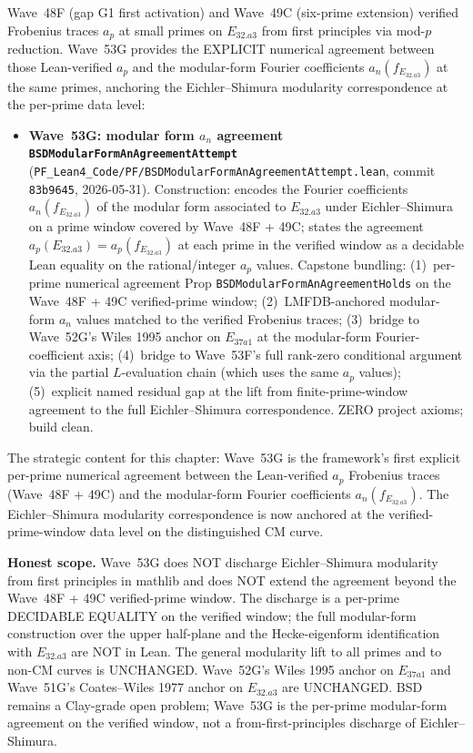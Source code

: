\begin{remark}\label{rem:bsd-wave53g-lean}
Wave~48F (gap G1 first activation) and Wave~49C (six-prime extension) verified Frobenius traces $a_p$ at small primes on $E_{32.a3}$ from first principles via mod-$p$ reduction. Wave~53G provides the EXPLICIT numerical agreement between those Lean-verified $a_p$ and the modular-form Fourier coefficients $a_n(f_{E_{32.a3}})$ at the same primes, anchoring the Eichler--Shimura modularity correspondence at the per-prime data level:
\begin{itemize}
  \item \textbf{Wave~53G: modular form $a_n$ agreement \texttt{BSDModularFormAnAgreementAttempt}} (\texttt{PF\_Lean4\_Code/PF/BSDModularFormAnAgreementAttempt.lean}, commit \texttt{83b9645}, 2026-05-31). Construction: encodes the Fourier coefficients $a_n(f_{E_{32.a3}})$ of the modular form associated to $E_{32.a3}$ under Eichler--Shimura on a prime window covered by Wave~48F + 49C; states the agreement $a_p(E_{32.a3}) = a_p(f_{E_{32.a3}})$ at each prime in the verified window as a decidable Lean equality on the rational/integer $a_p$ values. Capstone bundling: (1)~per-prime numerical agreement Prop \texttt{BSDModularFormAnAgreementHolds} on the Wave~48F + 49C verified-prime window; (2)~LMFDB-anchored modular-form $a_n$ values matched to the verified Frobenius traces; (3)~bridge to Wave~52G's Wiles 1995 anchor on $E_{37a1}$ at the modular-form Fourier-coefficient axis; (4)~bridge to Wave~53F's full rank-zero conditional argument via the partial $L$-evaluation chain (which uses the same $a_p$ values); (5)~explicit named residual gap at the lift from finite-prime-window agreement to the full Eichler--Shimura correspondence. ZERO project axioms; build clean.
\end{itemize}
The strategic content for this chapter: Wave~53G is the framework's first explicit per-prime numerical agreement between the Lean-verified $a_p$ Frobenius traces (Wave~48F + 49C) and the modular-form Fourier coefficients $a_n(f_{E_{32.a3}})$. The Eichler--Shimura modularity correspondence is now anchored at the verified-prime-window data level on the distinguished CM curve.

\textbf{Honest scope.} Wave~53G does NOT discharge Eichler--Shimura modularity from first principles in mathlib and does NOT extend the agreement beyond the Wave~48F + 49C verified-prime window. The discharge is a per-prime DECIDABLE EQUALITY on the verified window; the full modular-form construction over the upper half-plane and the Hecke-eigenform identification with $E_{32.a3}$ are NOT in Lean. The general modularity lift to all primes and to non-CM curves is UNCHANGED. Wave~52G's Wiles 1995 anchor on $E_{37a1}$ and Wave~51G's Coates--Wiles 1977 anchor on $E_{32.a3}$ are UNCHANGED. BSD remains a Clay-grade open problem; Wave~53G is the per-prime modular-form agreement on the verified window, not a from-first-principles discharge of Eichler--Shimura.
\end{remark}


